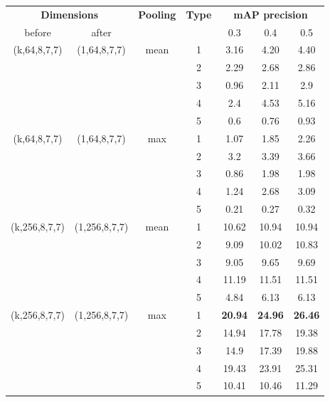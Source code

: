\begin{center}
\begin{longtable}{||c | c | c| c||c c c||}

  \hline
  \multicolumn{2}{||c|}{\textbf{Dimensions}} & \multirow{2}{*}{ \textbf{Pooling}} &\multirow{2}{*}{\textbf{Type}} & \multicolumn{3}{|c||}{\textbf{mAP precision}}\\

   before & after &  {} & {} &  0.3 &  0.4 & 0.5 \\
 \hline   \hline
 \multirow{5}{*}{(k,64,8,7,7)} & \multirow{5}{*}{(1,64,8,7,7)} & \multirow{5}{*}{mean}  & 1 &  3.16 & 4.20 & 4.40    \\
  \cline{4-7}
  {} & {} & {} & 2 &  2.29 & 2.68 & 2.86    \\
    \cline{4-7}
  {} & {} & {} & 3 & 0.96 & 2.11 & 2.9     \\
    \cline{4-7}
  {} & {} & {} & 4 &  2.4  & 4.53 & 5.16    \\
    \cline{4-7}
  {} & {} & {} & 5 &  0.6  & 0.76 & 0.93    \\
  \hline
 \multirow{5}{*}{(k,64,8,7,7)} & \multirow{5}{*}{(1,64,8,7,7)} & \multirow{5}{*}{max}  & 1 &  1.07 & 1.85 & 2.26    \\
    \cline{4-7}
  {} & {} & {} & 2 &  3.2 & 3.39 & 3.66    \\
    \cline{4-7}
  {} & {} & {} & 3 &  0.86 & 1.98 & 1.98    \\
    \cline{4-7}
  {} & {} & {} & 4 &  1.24 & 2.68 & 3.09    \\
    \cline{4-7}
  {} & {} & {} & 5 &  0.21 & 0.27 & 0.32    \\

  \hline   \hline

 \multirow{5}{*}{(k,256,8,7,7)} & \multirow{5}{*}{(1,256,8,7,7)} & \multirow{5}{*}{mean}  & 1 &  10.62 & 10.94 & 10.94    \\

    \cline{4-7}
  {} & {} & {} & 2 &  9.09  & 10.02 & 10.83   \\
    \cline{4-7}
  {} & {} & {} & 3 &  9.05  & 9.65  & 9.69    \\
    \cline{4-7}
  {} & {} & {} & 4 &  11.19 & 11.51 & 11.51   \\
    \cline{4-7}
  {} & {} & {} & 5 &  4.84  & 6.13  & 6.13   \\
    \hline
 \multirow{5}{*}{(k,256,8,7,7)} & \multirow{5}{*}{(1,256,8,7,7)} & \multirow{5}{*}{max}  & 1  & \bf 20.94 & \bf 24.96 & \bf 26.46   \\
    \cline{4-7}
  {} & {} & {} & 2  & 14.94 & 17.78 & 19.38   \\
    \cline{4-7}
  {} & {} & {} & 3  & 14.9 & 17.39 & 19.88   \\
    \cline{4-7}
  {} & {} & {} & 4  & 19.43 & 23.91 & 25.31   \\
    \cline{4-7}
  {} & {} & {} & 5  & 10.41 & 10.46 & 11.29   \\
  \hline   
  

\end{longtable}
\end{center}
